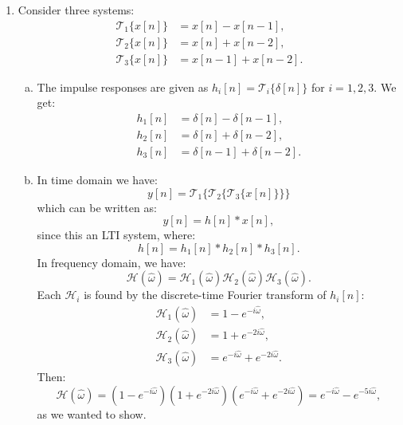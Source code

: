 \begin{enumerate}
  \item Consider three systems:
        \begin{align*}
          \mathcal{T}_{1}\{x[n]\} & =x[n]-x[n-1],   \\
          \mathcal{T}_{2}\{x[n]\} & =x[n]+x[n-2],   \\
          \mathcal{T}_{3}\{x[n]\} & =x[n-1]+x[n-2].
        \end{align*}

        \begin{enumerate}[a)]
          \item The impulse responses are given as $h_{i}[n]=\mathcal{T}_{i}\{\delta[n]\}$ for $i=1,2,3$. We get:
                \begin{align*}
                  h_{1}[n] & =\delta[n]-\delta[n-1],   \\
                  h_{2}[n] & =\delta[n]+\delta[n-2],   \\
                  h_{3}[n] & =\delta[n-1]+\delta[n-2].
                \end{align*}

          \item In time domain we have:
                \[ y[n]=\mathcal{T}_{1}\{\mathcal{T}_{2}\{\mathcal{T}_{3}\{x[n]\}\}\} \]
                which can be written as:
                \[ y[n]=h[n]*x[n], \]
                since this an LTI system, where:
                \[ h[n]=h_{1}[n]*h_{2}[n]*h_{3}[n]. \]
                In frequency domain, we have:
                \[ \mathcal{H}(\hat{\omega})=\mathcal{H}_{1}(\hat{\omega})\mathcal{H}_{2}(\hat{\omega})\mathcal{H}_{3}(\hat{\omega}). \]
                Each $\mathcal{H}_{i}$ is found by the discrete-time Fourier transform of $h_{i}[n]$:
                \begin{align*}
                  \mathcal{H}_{1}(\hat{\omega}) & =1-e^{-i\hat{\omega}},                   \\
                  \mathcal{H}_{2}(\hat{\omega}) & =1+e^{-2i\hat{\omega}},                  \\
                  \mathcal{H}_{3}(\hat{\omega}) & =e^{-i\hat{\omega}}+e^{-2i\hat{\omega}}.
                \end{align*}
                Then:
                \[ \mathcal{H}(\hat{\omega})=(1-e^{-i\hat{\omega}})(1+e^{-2i\hat{\omega}})(e^{-i\hat{\omega}}+e^{-2i\hat{\omega}})=e^{-i\hat{\omega}}-e^{-5i\hat{\omega}}, \]
                as we wanted to show.
        \end{enumerate}


\end{enumerate}
